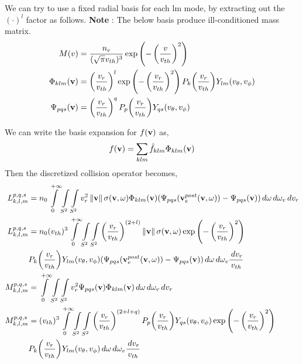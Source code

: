 \documentclass{article}[draft]
\begin{document}
We can try to use a fixed radial basis for each lm mode, by extracting out the $(\cdot)^{l}$ factor as follows. 
\textbf{Note} : The below basis produce ill-conditioned mass matrix. 
\begin{align*}
M(v) & = \frac{n_e}{(\sqrt{\pi}v_{th})^3} \exp{\left(-\left(\frac{v}{v_{th}}\right)^2 \right)} \\
\Phi_{klm} (\vect{v}) &= \left(\frac{v_r}{v_{th}}\right)^l \exp\left(-\left(\frac{v_r}{v_{th}}\right) ^ 2\right)  P_k\of{\frac{v_r}{v_{th}}} Y_{lm}(v_\theta,v_\phi) \\
\Psi_{pqs} (\vect{v}) &= \left(\frac{v_r}{v_{th}}\right)^q P_p\of{\frac{v_r}{v_{th}}} Y_{qs}(v_\theta,v_\phi)
\end{align*}

We can write the basis expansion for $f(\mathbf{v})$ as,  
\begin{align*}
	f(\mathbf{v})  = \sum_{klm} \hat{f}_{klm} \Phi_{klm} (\mathbf{v})
\end{align*}
Then the discretized collision operator becomes, 
\begin{align*}
{L}_{k,l,m}^{p,q,s} &=n_0 \myint_{0}^{+\infty} \myint_{S^2} \myint_{S^2} v_r^2 \norm{\vect{v}} \sigma(\vect{v},\omega) \Phi_{klm}(\vect{v})   (\Psi_{pqs}(\vect{v}_e^{post}(\vect{v},\omega)) - \Psi_{pqs}(\vect{v})) \diff{\omega} \diff{\omega_v} \diff{v_r} \\
{L}_{k,l,m}^{p,q,s} &=n_0 (v_{th})^3 \myint_{0}^{+\infty} \myint_{S^2} \myint_{S^2} \left(\frac{v_r}{v_{th}}\right)^{(2+l)} \norm{\vect{v}} \sigma(\vect{v},\omega) \exp\left(-\left(\frac{v_r}{v_{th}}\right) ^ 2\right) \\
&P_k\of{\frac{v_r}{v_{th}}} Y_{lm}(v_\theta,v_\phi)  (\Psi_{pqs}(\vect{v}_e^{post}(\vect{v},\omega)) - \Psi_{pqs}(\vect{v})) \diff{\omega} \diff{\omega_v} \frac{\diff{v_r}}{v_{th}} \\
{M}_{k,l,m}^{p,q,s} &= \myint_{0}^{+\infty} \myint_{S^2} \myint_{S^2}  v_r^2 \Psi_{pqs}(\vect{v}) \Phi_{klm}(\vect{v}) \diff{\omega} \diff{\omega_v} \diff{v_r}\\
{M}_{k,l,m}^{p,q,s} &= (v_{th})^3 \myint_{0}^{+\infty} \myint_{S^2} \myint_{S^2} 
					   \left(\frac{v_r}{v_{th}}\right)^{(2+l+q)} P_p\of{\frac{v_r}{v_{th}}} Y_{qs}(v_\theta,v_\phi) \exp\left(-\left(\frac{v_r}{v_{th}}\right) ^ 2\right)  \\& P_k\of{\frac{v_r}{v_{th}}} Y_{lm}(v_\theta,v_\phi) \diff{\omega} \diff{\omega_v} \frac{\diff{v_r}}{v_{th}}
\end{align*}
\end{document}
